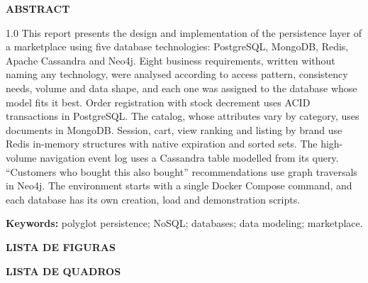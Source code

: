 \documentclass[12pt,a4paper,oneside]{article}
\begin{document}
\newpage\thispagestyle{semnum}
\begin{center}{\bfseries\MakeUppercase{Abstract}}\end{center}
\vspace{\baselineskip}
\begin{spacing}{1.0}
\noindent This report presents the design and implementation of the persistence layer of a marketplace using five database technologies: PostgreSQL, MongoDB, Redis, Apache Cassandra and Neo4j. Eight business requirements, written without naming any technology, were analysed according to access pattern, consistency needs, volume and data shape, and each one was assigned to the database whose model fits it best. Order registration with stock decrement uses ACID transactions in PostgreSQL. The catalog, whose attributes vary by category, uses documents in MongoDB. Session, cart, view ranking and listing by brand use Redis in-memory structures with native expiration and sorted sets. The high-volume navigation event log uses a Cassandra table modelled from its query. ``Customers who bought this also bought'' recommendations use graph traversals in Neo4j. The environment starts with a single Docker Compose command, and each database has its own creation, load and demonstration scripts.

\vspace{\baselineskip}
\noindent\textbf{Keywords:} polyglot persistence; NoSQL; databases; data modeling; marketplace.
\end{spacing}

\newpage\thispagestyle{semnum}
\begin{center}{\bfseries\MakeUppercase{Lista de Figuras}}\end{center}
\vspace{\baselineskip}
\renewcommand{\listfigurename}{}
\vspace{-2\baselineskip}
\listoffigures

\vspace{2\baselineskip}
\begin{center}{\bfseries\MakeUppercase{Lista de Quadros}}\end{center}
\vspace{\baselineskip}
\renewcommand{\listtablename}{}
\vspace{-2\baselineskip}
\listoftables
\end{document}

